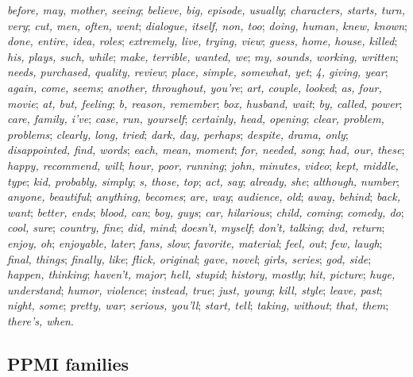 \textit{before, may, mother, seeing};
\textit{believe, big, episode, usually};
\textit{characters, starts, turn, very};
\textit{cut, men, often, went};
\textit{dialogue, itself, non, too};
\textit{doing, human, knew, known};
\textit{done, entire, idea, roles};
\textit{extremely, live, trying, view};
\textit{guess, home, house, killed};
\textit{his, plays, such, while};
\textit{make, terrible, wanted, we};
\textit{my, sounds, working, written};
\textit{needs, purchased, quality, review};
\textit{place, simple, somewhat, yet};
\textit{4, giving, year};
\textit{again, come, seems};
\textit{another, throughout, you're};
\textit{art, couple, looked};
\textit{as, four, movie};
\textit{at, but, feeling};
\textit{b, reason, remember};
\textit{box, husband, wait};
\textit{by, called, power};
\textit{care, family, i've};
\textit{case, run, yourself};
\textit{certainly, head, opening};
\textit{clear, problem, problems};
\textit{clearly, long, tried};
\textit{dark, day, perhaps};
\textit{despite, drama, only};
\textit{disappointed, find, words};
\textit{each, mean, moment};
\textit{for, needed, song};
\textit{had, our, these};
\textit{happy, recommend, will};
\textit{hour, poor, running};
\textit{john, minutes, video};
\textit{kept, middle, type};
\textit{kid, probably, simply};
\textit{s, those, top};
\textit{act, say};
\textit{already, she};
\textit{although, number};
\textit{anyone, beautiful};
\textit{anything, becomes};
\textit{are, way};
\textit{audience, old};
\textit{away, behind};
\textit{back, want};
\textit{better, ends};
\textit{blood, can};
\textit{boy, guys};
\textit{car, hilarious};
\textit{child, coming};
\textit{comedy, do};
\textit{cool, sure};
\textit{country, fine};
\textit{did, mind};
\textit{doesn't, myself};
\textit{don't, talking};
\textit{dvd, return};
\textit{enjoy, oh};
\textit{enjoyable, later};
\textit{fans, slow};
\textit{favorite, material};
\textit{feel, out};
\textit{few, laugh};
\textit{final, things};
\textit{finally, like};
\textit{flick, original};
\textit{gave, novel};
\textit{girls, series};
\textit{god, side};
\textit{happen, thinking};
\textit{haven't, major};
\textit{hell, stupid};
\textit{history, mostly};
\textit{hit, picture};
\textit{huge, understand};
\textit{humor, violence};
\textit{instead, true};
\textit{just, young};
\textit{kill, style};
\textit{leave, past};
\textit{night, some};
\textit{pretty, war};
\textit{serious, you'll};
\textit{start, tell};
\textit{taking, without};
\textit{that, them};
\textit{there's, when}.
\par\endgroup

\subsection{PPMI families}

